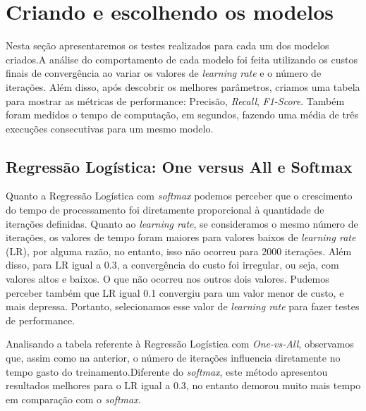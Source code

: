 \documentclass[conference]{IEEEtran}
\begin{document}
	
\section{Criando e escolhendo os modelos}

Nesta seção apresentaremos os testes realizados para cada um dos modelos criados.A análise do comportamento de cada modelo foi feita utilizando os custos finais de convergência ao variar os valores de \textit{learning rate} e o número de iterações. Além disso, após descobrir os melhores parâmetros, criamos uma tabela para mostrar as métricas de performance: Precisão, \textit{Recall}, \textit{F1-Score}. Também foram medidos o tempo de computação, em segundos, fazendo uma média de três execuções consecutivas para um mesmo modelo.

\subsection{Regressão Logística: One versus All e Softmax}

Quanto a Regressão Logística com \textit{softmax} podemos perceber que o crescimento do tempo de processamento foi diretamente proporcional à quantidade de iterações definidas. Quanto ao \textit{learning rate}, se consideramos o mesmo número de iterações, os valores de tempo foram maiores para valores baixos de \textit{learning rate} (LR), por alguma razão, no entanto, isso não ocorreu para 2000 iterações. Além disso, para LR igual a  0.3, a convergência do custo foi irregular, ou seja, com valores altos e baixos. O que não ocorreu nos outros dois valores. Pudemos perceber também que LR igual 0.1 convergiu para um valor menor de custo, e mais depressa. Portanto, selecionamos esse valor de \textit{learning rate} para fazer testes de performance. \par
Analisando a tabela referente à Regressão Logística com \textit{One-vs-All}, observamos que, assim como na anterior, o número de iterações influencia diretamente no tempo gasto do treinamento.Diferente do \textit{softmax}, este método apresentou resultados melhores para o LR igual a 0.3, no entanto demorou muito mais tempo em comparação com o \textit{softmax}.
\end{document}
